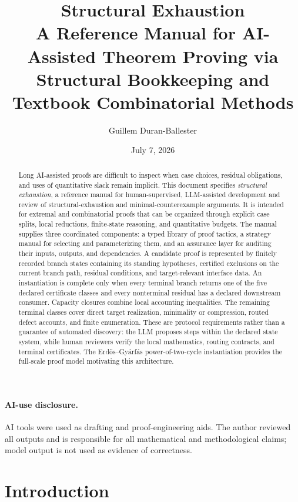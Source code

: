 \documentclass[
  11pt,
]{article}
\title{Structural Exhaustion\\[0.4em]
\large A Reference Manual for AI-Assisted Theorem Proving via Structural
Bookkeeping and Textbook Combinatorial Methods}
\author{Guillem Duran-Ballester}
\date{July 7, 2026}
\theoremstyle{definition}
\begin{document}
\maketitle

\begin{abstract}
Long AI-assisted proofs are difficult to inspect when case choices, residual
obligations, and uses of quantitative slack remain implicit. This document
specifies \emph{structural exhaustion}, a reference manual for human-supervised,
LLM-assisted development and review of structural-exhaustion and
minimal-counterexample arguments. It is intended for extremal and
combinatorial proofs that can be organized through explicit case splits, local
reductions, finite-state reasoning, and quantitative budgets. The manual
supplies three coordinated components: a typed library of proof tactics, a
strategy manual for selecting and parameterizing them, and an assurance layer
for auditing their inputs, outputs, and dependencies. A candidate proof is
represented by finitely recorded branch states containing its standing
hypotheses, certified exclusions on the current branch path, residual
conditions, and target-relevant interface data. An instantiation is complete only when every terminal branch
returns one of the five declared certificate classes and every nonterminal
residual has a declared downstream consumer. Capacity closures combine local
accounting inequalities. The remaining terminal classes cover direct target
realization, minimality or compression, routed defect accounts, and finite
enumeration.
These are protocol requirements rather than a guarantee of automated
discovery: the LLM proposes steps within the declared state system, while human
reviewers verify the local mathematics, routing contracts, and terminal
certificates. The Erdős--Gyárfás
power-of-two-cycle instantiation provides the full-scale proof model
motivating this architecture.
\end{abstract}

\paragraph*{AI-use disclosure.}
AI tools were used as drafting and proof-engineering aids. The author
reviewed all outputs and is responsible for all mathematical and
methodological claims; model output is not used as evidence of
correctness.

\tableofcontents

\section*{Introduction}\label{introduction}
\end{document}
